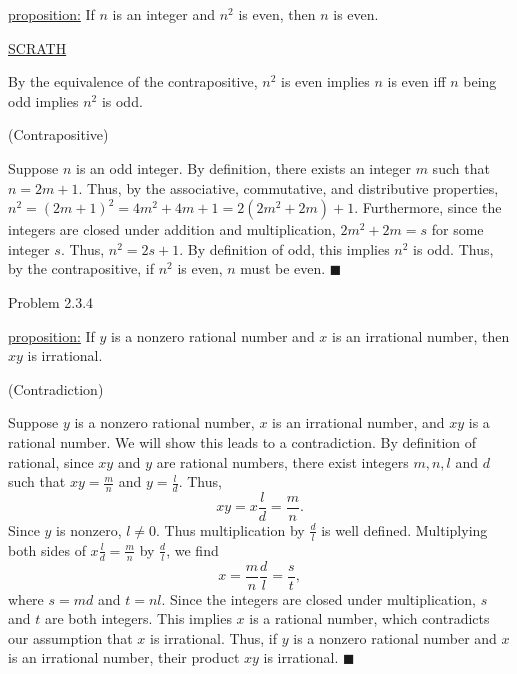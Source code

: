 \documentclass{article}
\theoremstyle{definition}
\begin{document}
	\underline{proposition:} If $n$ is an integer and $n^2$ is even,
	then $n$ is even.

	\vspace{0.3cm}

	\underline{SCRATH}

	By the equivalence of the contrapositive, $n^2$ is even implies $n$
	is even iff $n$ being odd implies $n^2$ is odd.

	\vspace{0.4cm}

	 (Contrapositive)

	\vspace{0.2cm} Suppose $n$ is an odd integer. By definition, there
	exists an integer $m$ such that $n=2m+1$. Thus, by the associative,
	commutative, and distributive properties,
	$n^2=(2m+1)^2=4m^2+4m+1=2(2m^2+2m)+1$. Furthermore, since the
	integers are closed under addition and multiplication, $2m^2+2m=s$
	for some integer $s$. Thus, $n^2=2s+1$. By definition of odd, this
	implies $n^2$ is odd. Thus, by the contrapositive, if $n^2$ is
	even, $n$ must be even. $\blacksquare$

	\vspace{1cm}
	\newpage


	\noindent Problem 2.3.4  \vspace{0.3cm}

	\underline{proposition:} If $y$ is a nonzero rational number and $x$
	is an irrational number, then $xy$ is irrational.

	\vspace{0.4cm}

	 (Contradiction)

	\vspace{0.2cm} Suppose $y$ is a nonzero rational number, $x$ is an
	irrational number, and $xy$ is a rational number. We will show this
	leads to a contradiction. By definition of rational, since $xy$ and
	$y$ are rational numbers, there exist integers $m, n, l$ and $d$
	such that $xy=\frac{m}{n}$ and $y=\frac{l}{d}$. Thus,
	$$xy=x\frac{l}{d}=\frac{m}{n}.$$  Since $y$ is nonzero, $l\not=0$. Thus multiplication by $\frac{d}{l}$ is well
	defined. Multiplying both sides of $x\frac{l}{d}=\frac{m}{n}$ by
	$\frac{d}{l}$, we find $$x=\frac{m}{n}\frac{d}{l}=\frac{s}{t},$$
	where $s=md$ and $t=nl$. Since the integers are closed under
	multiplication, $s$ and $t$ are both integers. This implies $x$ is
	a rational number, which contradicts our assumption that $x$ is
	irrational. Thus, if $y$ is a nonzero rational number and $x$ is an
	irrational number, their product $xy$ is irrational. $\blacksquare$
\end{document}
